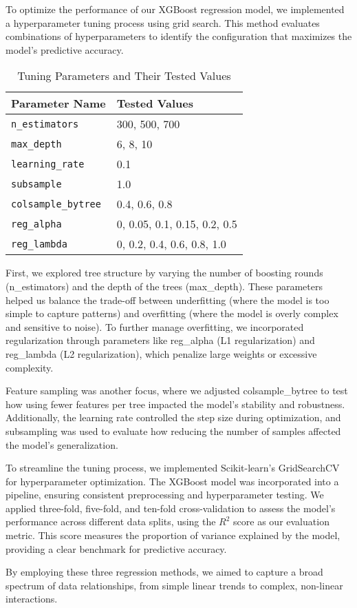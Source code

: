 To optimize the performance of our XGBoost regression model, we implemented a
hyperparameter tuning process using grid search. This method evaluates combinations
of hyperparameters to identify the configuration that maximizes the model's predictive
accuracy.

\begin{table}[h!]
	\centering
	\caption{Tuning Parameters and Their Tested Values}
	\renewcommand{\arraystretch}{1} %
	\setlength{\tabcolsep}{10pt} %
	\begin{tabular}{|l|l|}
		\hline
		\textbf{Parameter Name}    & \textbf{Tested Values}       \\
		\hline
		\texttt{n\_estimators}     & 300, 500, 700                \\
		\hline
		\texttt{max\_depth}        & 6, 8, 10                     \\
		\hline
		\texttt{learning\_rate}    & 0.1                          \\
		\hline
		\texttt{subsample}         & 1.0                          \\
		\hline
		\texttt{colsample\_bytree} & 0.4, 0.6, 0.8                \\
		\hline
		\texttt{reg\_alpha}        & 0, 0.05, 0.1, 0.15, 0.2, 0.5 \\
		\hline
		\texttt{reg\_lambda}       & 0, 0.2, 0.4, 0.6, 0.8, 1.0   \\
		\hline
	\end{tabular}
\end{table}
First, we explored tree structure by varying the number of boosting rounds (n\_estimators)
and the depth of the trees (max\_depth). These parameters helped us balance the trade-off
between underfitting (where the model is too simple to capture patterns) and overfitting
(where the model is overly complex and sensitive to noise). To further manage
overfitting, we incorporated regularization through parameters like reg\_alpha (L1
regularization) and reg\_lambda (L2 regularization), which penalize large
weights or excessive complexity.

Feature sampling was another focus, where we adjusted colsample\_bytree to test how
using fewer features per tree impacted the model's stability and robustness.
Additionally, the learning rate controlled the step size during optimization,
and subsampling was used to evaluate how reducing the number of samples affected
the model’s generalization.

To streamline the tuning process, we implemented Scikit-learn's GridSearchCV for
hyperparameter optimization. The XGBoost model was incorporated into a pipeline,
ensuring consistent preprocessing and hyperparameter testing. We applied three-fold,
five-fold, and ten-fold cross-validation to assess the model's performance
across different data splits, using the $R^{2}$ score as our evaluation metric.
This score measures the proportion of variance explained by the model, providing
a clear benchmark for predictive accuracy.

By employing these three regression methods, we aimed to capture a broad
spectrum of data relationships, from simple linear trends to complex, non-linear
interactions.